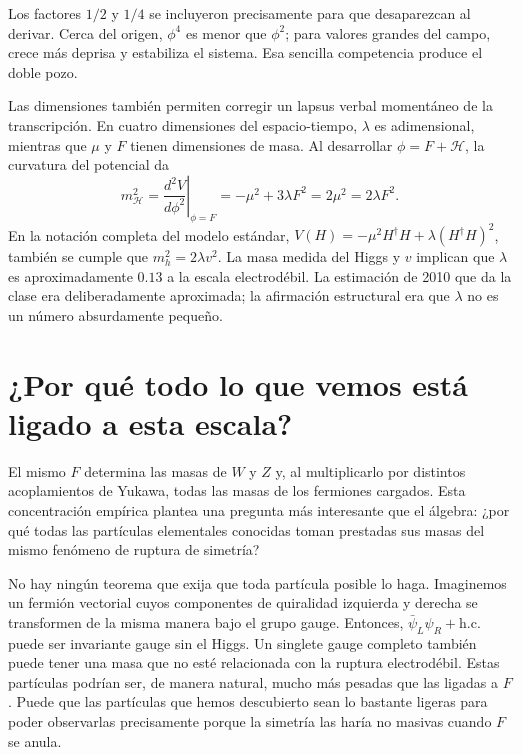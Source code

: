 Los factores \(1/2\) y \(1/4\) se incluyeron precisamente para que desaparezcan al derivar. Cerca del origen, \(\phi^4\) es menor que \(\phi^2\); para valores grandes del campo, crece más deprisa y estabiliza el sistema. Esa sencilla competencia produce el doble pozo.

Las dimensiones también permiten corregir un lapsus verbal momentáneo de la transcripción. En cuatro dimensiones del espacio-tiempo, \(\lambda\) es adimensional, mientras que \(\mu\) y \(F\) tienen dimensiones de masa. Al desarrollar \(\phi=F+\mathcal H\), la curvatura del potencial da
\begin{equation}
  m_{\mathcal H}^2
  =
  \left.\frac{d^2V}{d\phi^2}\right|_{\phi=F}
  =
  -\mu^2+3\lambda F^2
  =
  2\mu^2
  =
  2\lambda F^2.
  \label{eq:l10-higgs-curvature}
\end{equation}
En la notación completa del modelo estándar,
\(V(H)=-\mu^2H^\dagger H+\lambda(H^\dagger H)^2\), también se cumple que
\(m_h^2=2\lambda v^2\). La masa medida del Higgs y \(v\) implican que \(\lambda\) es aproximadamente \(0.13\) a la escala electrodébil. La estimación de 2010 que da la clase era deliberadamente aproximada; la afirmación estructural era que \(\lambda\) no es un número absurdamente pequeño.

\section{¿Por qué todo lo que vemos está ligado a esta escala?}

El mismo \(F\) determina las masas de \(W\) y \(Z\) y, al multiplicarlo por distintos acoplamientos de Yukawa, todas las masas de los fermiones cargados. Esta concentración empírica plantea una pregunta más interesante que el álgebra: ¿por qué todas las partículas elementales conocidas toman prestadas sus masas del mismo fenómeno de ruptura de simetría?

No hay ningún teorema que exija que toda partícula posible lo haga. Imaginemos un fermión vectorial cuyos componentes de quiralidad izquierda y derecha se transformen de la misma manera bajo el grupo gauge. Entonces,
\(\bar\psi_L\psi_R+\mathrm{h.c.}\) puede ser invariante gauge sin el Higgs. Un singlete gauge completo también puede tener una masa que no esté relacionada con la ruptura electrodébil. Estas partículas podrían ser, de manera natural, mucho más pesadas que las ligadas a \(F\). Puede que las partículas que hemos descubierto sean lo bastante ligeras para poder observarlas precisamente porque la simetría las haría no masivas cuando \(F\) se anula.

